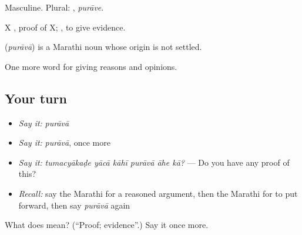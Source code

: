 Masculine. Plural: , \emph{purāve}.

X  , proof of X;  , to give evidence.

\begin{cousinweb}
\textbf{} (\emph{purāvā}) is a Marathi noun whose origin is not settled.
\end{cousinweb}

\begin{grammarlens}[title={What you've built}]
One more word for giving reasons and opinions.
\end{grammarlens}

\subsection*{Your turn}
\begin{itemize}
\raggedright
  \item \emph{Say it:} \emph{purāvā}
  \item \emph{Say it:} \emph{purāvā}, once more
  \item \emph{Say it:} \emph{tumacyākaḍe yācā kāhī purāvā āhe kā?} — Do you have any proof of this?
  \item \emph{Recall:} say the Marathi for a reasoned argument, then the Marathi for to put forward, then say \emph{purāvā} again
\end{itemize}

\begin{tcolorbox}[breakable,colback=teal!4,colframe=teal!35!black,title={Before you move on}]
What does  mean? (\textquotedblleft{}Proof; evidence\textquotedblright{}.) Say it once more.
\end{tcolorbox}
